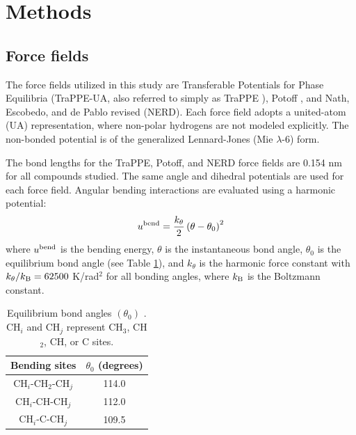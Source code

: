 \documentclass[journal=jced,manuscript=article]{achemso}
\begin{document}
\section{Methods} \label{sec: Methods}

\subsection{Force fields} \label{sec: Force fields}

    The force fields utilized in this study are Transferable Potentials for Phase Equilibria (TraPPE-UA, also referred to simply as TraPPE \cite{TraPPE,Martin1999,TraPPEUA2}), Potoff \cite{Mie,Potoff_branched}, and Nath, Escobedo, and de Pablo revised (NERD). Each force field adopts a united-atom (UA) representation, where non-polar hydrogens are not modeled explicitly. The non-bonded potential is of the generalized Lennard-Jones (Mie $\lambda$-6) form. 
    
    The bond lengths for the TraPPE, Potoff, and NERD force fields are 0.154 nm for all compounds studied. The same angle and dihedral potentials are used for each force field. Angular bending interactions are evaluated using a harmonic potential:
    \begin{equation}
    u^{\rm bend} = \frac{k_\theta}{2} \left(\theta-\theta_0\right)^2
    \end{equation}
    where $u^{\rm bend}$ is the bending energy, $\theta$ is the instantaneous bond angle, $\theta_0$ is the equilibrium bond angle (see Table \ref{tab:angles}), and $k_\theta$ is the harmonic force constant with $k_\theta/k_{\rm B} = 62500$ K/rad$^2$ for all bonding angles, where $k_{\rm B}$ is the Boltzmann constant. 
    
    \begin{table}[h!]
    	\caption{Equilibrium bond angles $(\theta_0)$ \cite{Martin1999}. CH$_i$ and CH$_j$ represent CH$_3$, CH$_2$, CH, or C sites.} \label{tab:angles}
    	\begin{center}
    		\begin{tabular}{|c|c|}
    			\hline
    			Bending sites & $\theta_0$ (degrees) \\ \hline
    			CH$_i$-CH$_2$-CH$_j$ & 114.0 \\ 
    			CH$_i$-CH-CH$_j$ & 112.0 \\ 
    			CH$_i$-C-CH$_j$ & 109.5 \\  
    			\hline
    		\end{tabular}
    	\end{center} 
    \end{table}
    
\end{document}
